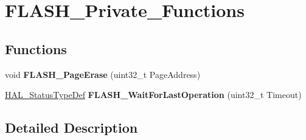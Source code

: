 \hypertarget{group___f_l_a_s_h___private___functions}{\section{F\-L\-A\-S\-H\-\_\-\-Private\-\_\-\-Functions}
\label{group___f_l_a_s_h___private___functions}
}
\subsection*{Functions}
\begin{DoxyCompactItemize}
\item 
\hypertarget{group___f_l_a_s_h___private___functions_ga35fd7dd876d296b20c2733f55dde7da7}{void {\bfseries F\-L\-A\-S\-H\-\_\-\-Page\-Erase} (uint32\-\_\-t Page\-Address)}\label{group___f_l_a_s_h___private___functions_ga35fd7dd876d296b20c2733f55dde7da7}

\item 
\hypertarget{group___f_l_a_s_h___private___functions_gaf89afc110a32ac9dcf0d06b89ffd9224}{\hyperlink{stm32l1xx__hal__def_8h_a63c0679d1cb8b8c684fbb0632743478f}{H\-A\-L\-\_\-\-Status\-Type\-Def} {\bfseries F\-L\-A\-S\-H\-\_\-\-Wait\-For\-Last\-Operation} (uint32\-\_\-t Timeout)}\label{group___f_l_a_s_h___private___functions_gaf89afc110a32ac9dcf0d06b89ffd9224}

\end{DoxyCompactItemize}


\subsection{Detailed Description}

